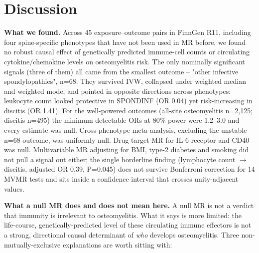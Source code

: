 \documentclass[11pt]{article}
\begin{document}
\section{Discussion}
\textbf{What we found.} Across 45 exposure--outcome pairs in FinnGen R11, including four spine-specific phenotypes that have not been used in MR before, we found no robust causal effect of genetically predicted immune-cell counts or circulating cytokine/chemokine levels on osteomyelitis risk. The only nominally significant signals (three of them) all came from the smallest outcome -- "other infective spondylopathies", n=68. They survived IVW, collapsed under weighted median and weighted mode, and pointed in opposite directions across phenotypes: leukocyte count looked protective in SPONDINF (OR 0.04) yet risk-increasing in discitis (OR 1.41). For the well-powered outcomes (all-site osteomyelitis n=2,125; discitis n=495) the minimum detectable ORs at 80\% power were 1.2--3.0 and every estimate was null. Cross-phenotype meta-analysis, excluding the unstable n=68 outcome, was uniformly null. Drug-target MR for IL-6 receptor and CD40 was null. Multivariable MR adjusting for BMI, type-2 diabetes and smoking did not pull a signal out either; the single borderline finding (lymphocyte count $\rightarrow$  discitis, adjusted OR 0.39, P=0.045) does not survive Bonferroni correction for 14 MVMR tests and sits inside a confidence interval that crosses unity-adjacent values.

\textbf{What a null MR does and does not mean here.} A null MR is not a verdict that immunity is irrelevant to osteomyelitis. What it says is more limited: the life-course, genetically-predicted level of these circulating immune effectors is not a strong, directional causal determinant of \emph{who} develops osteomyelitis. Three non-mutually-exclusive explanations are worth sitting with:
\end{document}
